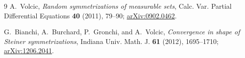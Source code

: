 \documentclass[11pt]{article}
\begin{document}
\begin{thebibliography}{9}
A.~Volcic,
\emph{Random symmetrizations of measurable sets},
Calc. Var. Partial Differential Equations \textbf{40} (2011), 79--90;
\href{https://arxiv.org/abs/0902.0462}{arXiv:0902.0462}.

G.~Bianchi, A.~Burchard, P.~Gronchi, and A.~Volcic,
\emph{Convergence in shape of Steiner symmetrizations},
Indiana Univ. Math. J. \textbf{61} (2012), 1695--1710;
\href{https://arxiv.org/abs/1206.2041}{arXiv:1206.2041}.
\end{thebibliography}
\end{document}
